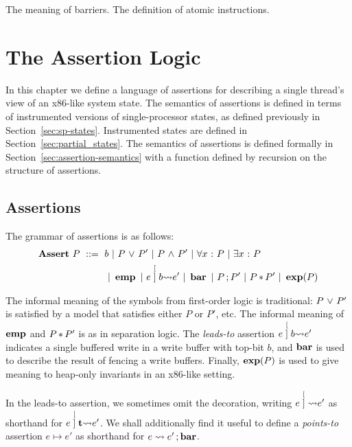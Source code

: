 \documentclass[11pt]{report}
\begin{document}
The meaning of barriers. The definition of atomic instructions. 


\chapter{The Assertion Logic}

In this chapter we define a language of assertions for describing a single thread's view of an x86-like system state. The semantics of assertions is defined in terms of instrumented versions of single-processor states, as defined previously in Section~\ref{sec:sp-states}. Instrumented states are defined in Section~\ref{sec:partial_states}. The semantics of assertions is defined formally in Section~\ref{sec:assertion-semantics} with a function defined by recursion on the structure of assertions.


\section{Assertions} %
\label{sec:assertions}

The grammar of assertions is as follows: 
\begin{align*}
	\mathbf{Assert}~P ~::=~ {} & b ~|~ P \operatorname{\,\vee\,} P' ~|~ P \operatorname{\,\wedge\,} P' ~|~ \forall x \operatorname{\,:\,} P ~|~ \exists x \operatorname{\,:\,} P \\
	&  ~|~ \operatorname{\mathbf{emp}} ~|~ e \stackrel[]{b}{\leadsto} e' ~|~ \operatorname{\mathbf{bar}} ~|~ P \operatorname{;} P' ~|~ P \operatorname{\ast} P' ~|~ \operatorname{\mathbf{exp}}(P)
\end{align*} 

The informal meaning of the symbols from first-order logic is traditional: $P \operatorname{\,\vee\,} P'$ is satisfied by a model that satisfies either $P$ or $P'$, etc. The informal meaning of $\operatorname{\mathbf{emp}}$ and $P \operatorname{\ast} P'$ is as in separation logic. The \emph{leads-to} assertion $e \stackrel[]{b}{\leadsto} e'$ indicates a single buffered write in a write buffer with top-bit $b$, and $\operatorname{\mathbf{bar}}$ is used to describe the result of fencing a write buffers. Finally, $\operatorname{\mathbf{exp}}(P)$ is used to give meaning to heap-only invariants in an x86-like setting.

In the leads-to assertion, we sometimes omit the decoration, writing $e \stackrel[]{}{\leadsto} e'$ as shorthand for $e \stackrel[]{\ensuremath{\mathbf{t}}}{\leadsto} e'$. We shall additionally find it useful to define a \emph{points-to} assertion $e \mapsto e'$ as shorthand for $e \leadsto e' \operatorname{;} \operatorname{\mathbf{bar}}$. 

\end{document}
